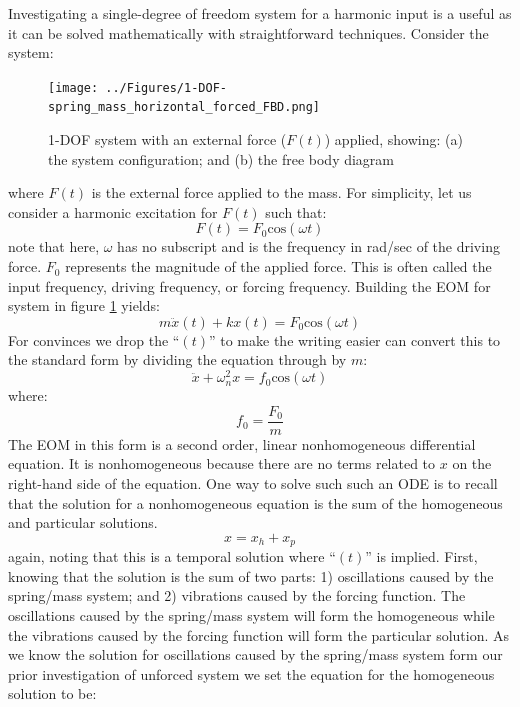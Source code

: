 \documentclass[12pt,letter]{article}
\numberwithin{ex}{section} %
\numberwithin{re}{section} %
\begin{document}
			
			Investigating a single-degree of freedom system for a harmonic input is a useful as it can be solved mathematically with straightforward techniques. Consider the system:
			\begin{figure}[H]
				\centering
				\texttt{[image: ../Figures/1-DOF-spring\_mass\_horizontal\_forced\_FBD.png]}
				\caption{1-DOF system with an external force ($F(t)$) applied, showing: (a) the system configuration; and (b) the free body diagram}
				\label{fig:1-DOF-spring_mass_horizontal_forced_FBD}
			\end{figure}	
			\noindent where $F(t)$ is the external force applied to the mass. For simplicity, let us consider a harmonic excitation for $F(t)$ such that:
			\begin{equation}
				F(t) = F_0\text{cos}(\omega t)
			\end{equation}							
			note that here, $\omega$ has no subscript and is the frequency in rad/sec of the driving force. $F_0$ represents the magnitude of the applied force. This is often called the input frequency, driving frequency, or forcing frequency. Building the EOM for system in figure \ref{fig:1-DOF-spring_mass_horizontal_forced_FBD} yields:
			\begin{equation}
				m \ddot{x}(t)+kx(t) = F_0\text{cos}(\omega t)
			\end{equation}			
			For convinces we drop the ``$(t)$'' to make the writing easier can convert this to the standard form by dividing the equation through by $m$:					
			\begin{equation}
				\ddot{x}+\omega_n^2x = f_0\text{cos}(\omega t)
			\end{equation}					
			where:
			\begin{equation}
				f_0 = \frac{F_0}{m}
			\end{equation}	
			The EOM in this form is a second order, linear nonhomogeneous differential equation. It is nonhomogeneous because there are no terms related to $x$ on the right-hand side of the equation. One way to solve such such an ODE is to recall that the solution for a nonhomogeneous equation is the sum of the homogeneous and particular solutions. 
			\begin{equation}
				x = x_h + x_p
			\end{equation}	
			again, noting that this is a temporal solution where ``$(t)$'' is implied. First, knowing that the solution is the sum of two parts: 1) oscillations caused by the spring/mass system; and 2) vibrations caused by the forcing function. The oscillations caused by the spring/mass system will form the homogeneous while the vibrations caused by the forcing function will form the particular solution. As we know the solution for oscillations caused by the spring/mass system form our prior investigation of unforced system we set the equation for the homogeneous solution to be:
\end{document}
